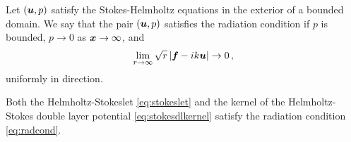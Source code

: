 \begin{definition}
Let $({\boldsymbol u},p)$ satisfy the Stokes-Helmholtz equations in
the exterior of a bounded domain. We say that
the pair $({\boldsymbol u},p)$ satisfies the radiation condition if
$p$ is bounded, $p \to 0$ as ${\boldsymbol x} \to \infty$, and 
\begin{equation}
\lim_{r\to \infty} \sqrt{r} \left| {\boldsymbol f} - i k {\boldsymbol u} \right| \to 0 \, ,
\label{eq:radcond}
\end{equation}
uniformly in direction.
\end{definition}

\begin{proposition}
Both the Helmholtz-Stokeslet \eqref{eq:stokeslet} and the
kernel of the Helmholtz-Stokes double layer potential
\eqref{eq:stokesdlkernel} satisfy the radiation condition
\eqref{eq:radcond}.
\end{proposition}

